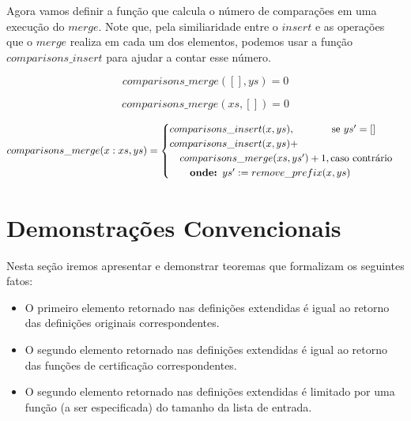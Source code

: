 \documentclass[12pt, oneside, a4paper,english,brazil]{abntex2}
\begin{document}
\qquad Agora vamos definir a fun\c{c}\~ao que calcula o n\'umero de compara\c{c}\~oes em uma execu\c{c}\~ao
do $merge$. Note que, pela similiaridade entre
o $insert$ e as opera\c{c}\~oes que o $merge$ realiza em cada um dos elementos,
podemos usar a fun\c{c}\~ao $comparisons\_insert$ para ajudar a contar esse n\'umero.

\begin{equation} \label{comp_merge_base_1}
  comparisons\_merge([], ys) = 0
\end{equation}

\begin{equation} \label{comp_merge_base_2}
  comparisons\_merge(xs, []) = 0
\end{equation}

\begin{equation} \label{comp_merge_ind}
\begin{split}
  comparisons\_merge(x : xs, ys) =
      \begin{cases}
        comparisons\_insert(x, ys), \text{\qquad \quad \,\, se } ys' = [] \\
        comparisons\_insert(x, ys) + \\ \text{\quad} comparisons\_merge(xs, ys') + 1, \text{caso contr\'ario}\\
        \text{\qquad\textbf{onde: }} ys' := remove\_prefix(x, ys)
      \end{cases} \\
\end{split}
\end{equation}

\chapter{Demonstra\c{c}\~oes Convencionais}

Nesta se\c{c}\~ao iremos apresentar e demonstrar teoremas que formalizam os seguintes fatos:
\begin{itemize}
  \item O primeiro elemento retornado nas defini\c{c}\~oes extendidas \'e igual ao retorno das defini\c{c}\~oes originais correspondentes.
  \item O segundo elemento retornado nas defini\c{c}\~oes extendidas \'e igual ao retorno das fun\c{c}\~oes de certifica\c{c}\~ao correspondentes.
  \item O segundo elemento retornado nas defini\c{c}\~oes extendidas \'e limitado por uma fun\c{c}\~ao (a ser especificada) do tamanho da lista de entrada.
\end{itemize}
\end{document}
